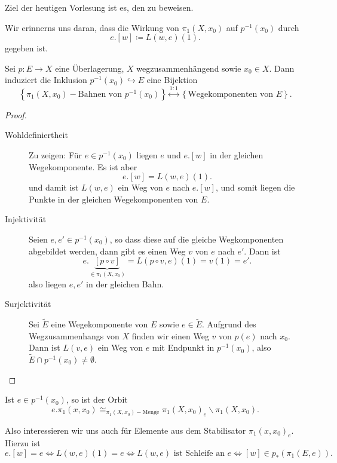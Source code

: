 
Ziel der heutigen Vorlesung ist es, den \nameref{} zu beweisen.

Wir erinnerns uns daran, dass die Wirkung von $\pi_1(X,x_0)$ auf $p^{-1} (x_0)$ durch
\[
    e.[w] \coloneqq  L(w,e)(1)
.\] 
gegeben ist.
\begin{proposition}
    Sei $p\colon E\to X$ eine Überlagerung,  $X$ wegzusammenhängend sowie  $x_0\in X$. Dann induziert die Inklusion $p^{-1} (x_0) \hookrightarrow E$ eine Bijektion
    \[
        \left \{\pi_1(X,x_0) - \text{Bahnen von } p^{-1} (x_0) \right\}  \stackrel{1:1}{\longleftrightarrow} \left \{\text{Wegekomponenten von } E\right\} 
    .\] 
\end{proposition}

\begin{proof}
    \begin{description}
        \item[Wohldefiniertheit] Zu zeigen: Für $e\in p^{-1} (x_0)$ liegen $e$ und  $e.[w]$ in der gleichen Wegekomponente. Es ist aber
             \[
                 e.[w] = L(w,e)(1)
            .\] 
            und damit ist $L(w,e)$ ein Weg von  $e$ nach  $e.[w]$, und somit liegen die Punkte in der gleichen Wegekomponenten von  $E$.
        \item[Injektivität] Seien  $e,e'\in p^{-1} (x_0)$, so dass diese auf die gleiche Wegkomponenten abgebildet werden, dann gibt es einen Weg $v$ von  $e$ nach  $e'$. Dann ist
             \[
                 e.\underbrace{[p \circ  v]}_{\in \pi_1(X,x_0)}  = L(p \circ  v, e)(1) = v(1) = e'
            .\] 
            also liegen $e,e'$ in der gleichen Bahn.
        \item[Surjektivität] Sei  $\tilde{E}$ eine Wegekomponente von $E$ sowie  $e\in \tilde{E}$. Aufgrund des Wegzusammenhangs von $X$ finden wir einen Weg  $v$ von  $p(e)$ nach  $x_0$. Dann ist $L(v,e)$ ein Weg von  $e$ mit Endpunkt in  $p^{-1} (x_0)$, also $\tilde{E} \cap  p^{-1} (x_0) \neq  \emptyset$.
    \end{description}
\end{proof}

Ist $e\in p^{-1} (x_0)$, so ist der Orbit
\[
    e.\pi_1(x,x_0) \cong_{\pi_1(X,x_0)-\text{Menge}} \pi_1(X,x_0)_e \backslash \pi_1(X,x_0)
.\] 

Also interessieren wir uns auch für Elemente aus dem Stabilisator $\pi_1(x,x_0)_e$. Hierzu ist
\[
    e.[w] = e \iff  L(w,e)(1) = e \iff  L(w,e) \text{ ist Schleife an } e \iff  [w] \in  p_*(\pi_1(E,e))
.\] 

